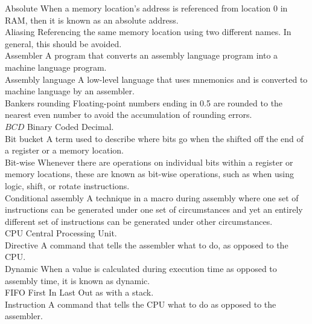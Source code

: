 \documentclass[10pt]{article}
\begin{document}
Absolute When a memory location's address is referenced from location 0 in RAM, then it is known as an absolute address.\\
Aliasing Referencing the same memory location using two different names. In general, this should be avoided.\\
Assembler A program that converts an assembly language program into a machine language program.\\
Assembly language A low-level language that uses mnemonics and is converted to machine language by an assembler.\\
Bankers rounding Floating-point numbers ending in 0.5 are rounded to the nearest even number to avoid the accumulation of rounding errors.\\
$B C D$ Binary Coded Decimal.\\
Bit bucket A term used to describe where bits go when the shifted off the end of a register or a memory location.\\
Bit-wise Whenever there are operations on individual bits within a register or memory locations, these are known as bit-wise operations, such as when using logic, shift, or rotate instructions.\\
Conditional assembly A technique in a macro during assembly where one set of instructions can be generated under one set of circumstances and yet an entirely different set of instructions can be generated under other circumstances.\\
CPU Central Processing Unit.\\
Directive A command that tells the assembler what to do, as opposed to the CPU.\\
Dynamic When a value is calculated during execution time as opposed to assembly time, it is known as dynamic.\\
FIFO First In Last Out as with a stack.\\
Instruction A command that tells the CPU what to do as opposed to the assembler.
\end{document}
